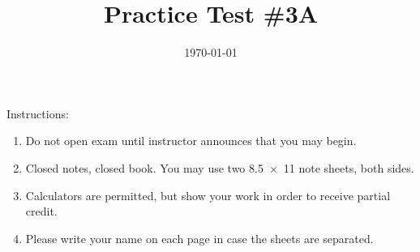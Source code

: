 \documentclass[exam,addpoints, answers]{exam}
\title{Practice Test \#3A}
\date{\today}
\author{\mobeardInstructorShort}
\begin{document}
\maketitle
\vfill
\mobeardExamNameBlock
\vfill
Instructions: 
\begin{enumerate}
\item Do not open exam until instructor announces that you may begin.
\item Closed notes, closed book.  You may use two \SI{8.5x11}{\inch} note sheets, both sides. 
\item Calculators are permitted, but show your work in order to receive partial credit. 
\item Please write your name on each page in case the sheets are separated. 
\end{enumerate}
\vfill
\begin{center}
\gradetable[h][questions]
\end{center}
\clearpage
\end{document}
